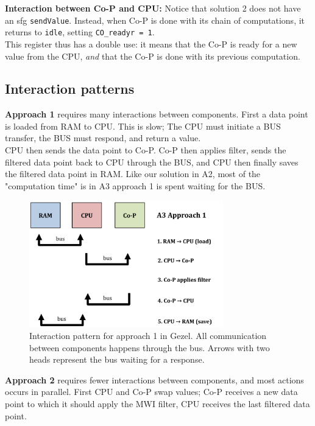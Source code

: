 \textbf{Interaction between Co-P and CPU:} Notice that solution 2 does not have an sfg \texttt{sendValue}. Instead, when Co-P is done with its chain of computations, it returns to \texttt{idle}, setting \texttt{CO\_readyr = 1}. \\

This register thus has a double use: it means that the Co-P is ready for a new value from the CPU, \textit{and} that the Co-P is done with its previous computation.

\subsection{Interaction patterns}

\textbf{Approach 1} requires many interactions between components. First a data point is loaded from RAM to CPU. This is slow; The CPU must initiate a BUS transfer, the BUS must respond, and return a value.\\

CPU then sends the data point to Co-P. Co-P then applies filter, sends the filtered data point back to CPU through the BUS, and CPU then finally saves the filtered data point in RAM. Like our solution in A2, most of the "computation time" is in A3 approach 1 is spent waiting for the BUS. 

\begin{figure}[H]
    \centering
    \includegraphics[width=0.75\textwidth]{2Implementation/fig/interaction1.pdf}
    \caption{Interaction pattern for approach 1 in Gezel. All communication between components happens through the bus. Arrows with two heads represent the bus waiting for a response.}
    \label{fig:interaction1}
\end{figure}

\textbf{Approach 2} requires fewer interactions between components, and most actions occurs in parallel. First CPU and Co-P swap values; Co-P receives a new data point to which it should apply the MWI filter, CPU receives the last filtered data point. \\

